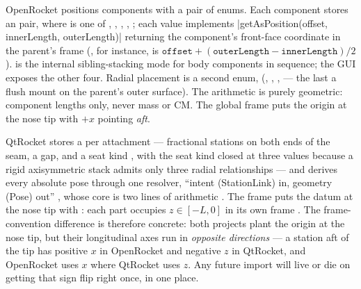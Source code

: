 OpenRocket positions components with a pair of enums. Each component stores an
 pair, where  is one of ,
, , , ; each value implements
\cppinline|getAsPosition(offset, innerLength, outerLength)| returning the component's
front-face coordinate in the parent's frame (, for instance, is
$\mathtt{offset} + (\mathtt{outerLength} - \mathtt{innerLength})/2$).  is the
internal sibling-stacking mode for body components in sequence; the GUI exposes the other
four. Radial placement is a second enum,  (, ,
,  --- the last a flush mount on the parent's outer surface).
The arithmetic is purely geometric: component lengths only, never mass or CM. The global
frame puts the origin at the nose tip with $+x$ pointing \emph{aft}.

QtRocket stores a  per attachment --- fractional stations on both ends of
the seam, a gap, and a seat kind , with the seat kind
closed at three values because a rigid axisymmetric stack admits only three radial
relationships  --- and derives every absolute pose through
one resolver, ``intent (StationLink) in, geometry (Pose) out''
, whose core is two lines of arithmetic
. The frame puts the datum at the nose tip with \zfwd:
each part occupies $z \in [-L, 0]$ in its own frame . The
frame-convention difference is therefore concrete: both projects plant the origin at the
nose tip, but their longitudinal axes run in \emph{opposite directions} --- a station aft
of the tip has positive $x$ in OpenRocket and negative $z$ in QtRocket, and OpenRocket uses
$x$ where QtRocket uses $z$. Any future  import will live or die on getting that
sign flip right once, in one place.

